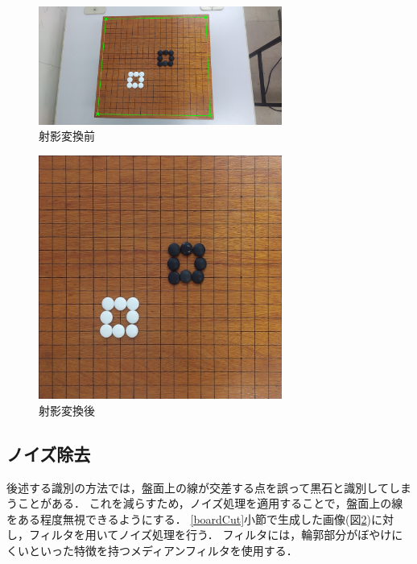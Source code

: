 \documentclass[openright]{nitocs}
\numberwithin{equation}{section}
\begin{document}
            \begin{figure}[tb] %
                \begin{center}
                \includegraphics[clip,width=80mm]{cornerImg.jpg} 
                \caption{射影変換前}
                \label{cornerImg}
                \end{center}
            \end{figure}
            \begin{figure}[tb] %
                \begin{center}
                \includegraphics[clip,width=80mm]{boardImg.jpg} 
                \caption{射影変換後}
                \label{boardImg}
                \end{center}
            \end{figure}

        \subsection{ノイズ除去}
        \label{noiseReduce}
            後述する識別の方法では，盤面上の線が交差する点を誤って黒石と識別してしまうことがある．
            これを減らすため，ノイズ処理を適用することで，盤面上の線をある程度無視できるようにする． 
            \ref{boardCut}小節で生成した画像(図\ref{boardImg})に対し，フィルタを用いてノイズ処理を行う．
            フィルタには，輪郭部分がぼやけにくいといった特徴を持つメディアンフィルタを使用する．
            
\end{document}
